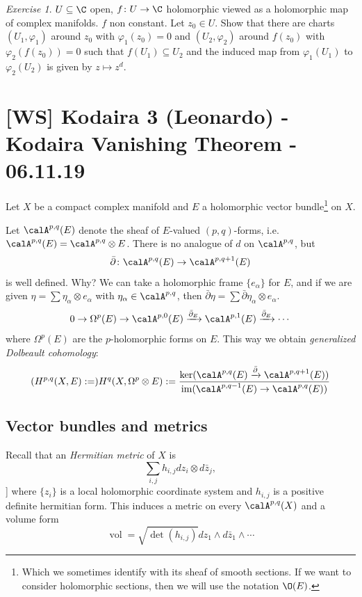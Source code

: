 \documentclass[A4paper, british]{amsart}
\theoremstyle{darkgreentheorem}
\theoremstyle{darkbluedefinition}
\theoremstyle{darkredexample}
\theoremstyle{remark}
\newtheorem{exe}[thm]{Exercise}
\DeclareMathOperator{\im}{im}
\DeclareMathOperator{\vol}{vol}
\newcommand{\1}{\mathbbm{1}}
\newcommand{\ot}{\otimes}
\newcommand{\sub}{\subseteq}
\begin{document}
\begin{exe}
    $U\sub\C$ open, $f\colon U\to \C$ holomorphic viewed as a holomorphic map of complex manifolds.
    $f$ non constant.
    Let $z_{0}\in U$.
    Show that there are charts $(U_{1},\varphi_{1})$ around $z_{0}$ with $\varphi_{1}(z_{0})=0$ and $(U_{2},\varphi_{2})$ around $f(z_{0})$ with $\varphi_{2}(f(z_{0}))=0$ such that $f(U_{1})\sub U_{2}$ and the induced map from $\varphi_{1}(U_{1})$ to $\varphi_{2}(U_{2})$ is given by $z\mapsto z^{d}$.
\end{exe}

\section{[WS] Kodaira 3 (Leonardo) - Kodaira Vanishing Theorem - 06.11.19}

Let $X$ be a compact complex manifold and $E$ a holomorphic vector bundle\footnote{Which we sometimes identify with its sheaf of smooth sections. If we want to consider holomorphic sections, then we will use the notation $\O(E)$.} on $X$.

Let $\calA^{p,q}(E)$ denote the sheaf of $E$-valued $(p,q)$-forms, i.e. $\calA^{p,q}(E)=\calA^{p,q}\ot E$.
There is no analogue of $d$ on $\calA^{p,q}$, but
\[ \bar{\partial }\colon \calA^{p,q}(E)\to \calA^{p,q+1}(E) \]
is well defined.
Why?
We can take a holomorphic frame $\{ e_{\alpha}\}$ for $E$, and if we are given $\eta=\sum \eta_{\alpha}\ot e_{\alpha}$ with $\eta_{\alpha}\in \calA^{p,q}$, then $\bar{\partial }\eta=\sum\bar{\partial}\eta_{\alpha}\ot e_{\alpha}$.
\[ 0\to \Omega^{p}(E)\to \calA^{p,0}(E)\xrightarrow{\bar{\partial}_{E}} \calA^{p,1}(E)\xrightarrow{\bar{\partial}_{E}}\cdots \]
where $\Omega^{p}(E)$ are the $p$-holomorphic forms on $E$.
This way we obtain \textit{generalized Dolbeault cohomology}:
\[ (H^{p,q}(X,E):=)H^{q}(X,\Omega^{p}\ot E):=\frac{\ker(\calA^{p,q}(E)\xrightarrow{\bar{\partial}}\calA^{p,q+1}(E))}{\im(\calA^{p,q-1}(E)\to \calA^{p,q}(E))} \]

\subsection{Vector bundles and metrics}

Recall that an \textit{Hermitian metric} of $X$ is
\[ \sum_{i,j}h_{i,j}dz_{i}\ot d\bar{z}_{j},\]]
where $\{z_{i}\}$ is a local holomorphic coordinate system and $h_{i,j}$ is a positive definite hermitian form.
This induces a metric on every $\calA^{p,q}(X)$ and a volume form
\[ \vol=\sqrt{\det(h_{i,j})}dz_{1}\wedge d\bar{z}_{1}\wedge \cdots \]
\end{document}
